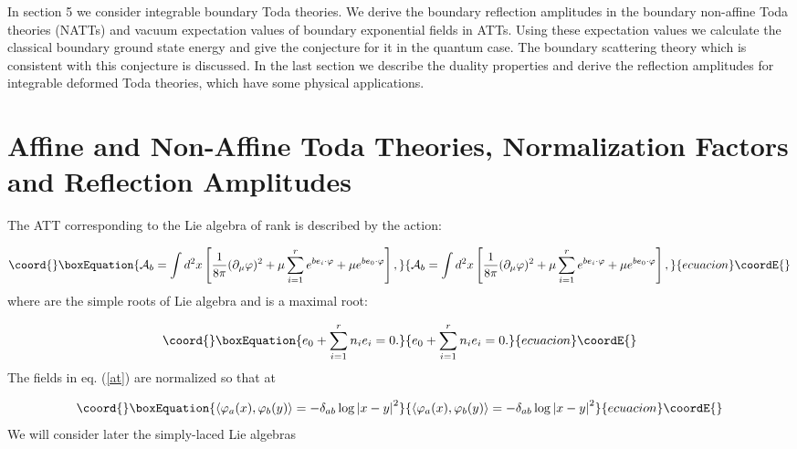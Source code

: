 \documentclass[a4paper,12pt]{article}
\begin{document}
In section 5 we consider integrable boundary Toda theories. We derive
the boundary reflection amplitudes in the boundary non-affine Toda theories
(NATTs) and vacuum expectation values of boundary exponential fields in 
ATTs. Using these expectation values we calculate the classical boundary ground 
state energy and give the conjecture for it in the quantum case. The boundary 
scattering theory which is consistent with this conjecture is discussed. 
In the last section we describe the duality properties and derive the
reflection amplitudes for integrable deformed Toda theories, which have some 
physical applications.

\section{ Affine and Non-Affine Toda Theories, Normalization Factors and
Reflection Amplitudes}

The ATT corresponding to the Lie algebra \coordHE{} of rank \coordHE{} is described by the
action:

\begin{equation}\coord{}\boxEquation{
{\cal A}_b=\int     d^2x\left[ \frac 1{8\pi }(\partial _\mu \varphi )^2+\mu
\sum_{i=1}^re^{be_i\cdot \varphi }+\mu e^{be_0\cdot \varphi }\right] ,
\label{at}
}{
{\cal A}_b=\int     d^2x\left[ \frac 1{8\pi }(\partial _\mu \varphi )^2+\mu
\sum_{i=1}^re^{be_i\cdot \varphi }+\mu e^{be_0\cdot \varphi }\right] ,
}{ecuacion}\coordE{}\end{equation}
where \coordHE{}  \coordHE{} are the simple roots of Lie algebra \coordHE{} and \coordHE{}
is a maximal root:

\begin{equation}\coord{}\boxEquation{
e_0+\sum_{i=1}^rn_ie_i=0.  \label{mr}
}{
e_0+\sum_{i=1}^rn_ie_i=0.  }{ecuacion}\coordE{}\end{equation}
The fields \myHighlight{$\varphi $}\coordHE{} in eq. (\ref{at}) are normalized so that at \coordHE{}

\begin{equation}\coord{}\boxEquation{
\left\langle \varphi _a(x),\varphi _b(y)\right\rangle =-\delta _{ab}\log
\left| x-y\right| ^2  \label{n}
}{
\left\langle \varphi _a(x),\varphi _b(y)\right\rangle =-\delta _{ab}\log
\left| x-y\right| ^2  }{ecuacion}\coordE{}\end{equation}
We will consider later the simply-laced Lie algebras \coordHE{}
\end{document}
